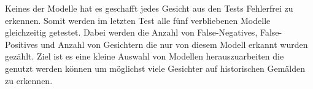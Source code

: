 Keines der Modelle hat es geschafft jedes Gesicht aus den Tests Fehlerfrei zu erkennen. Somit werden im letzten Test alle fünf verbliebenen Modelle gleichzeitig getestet. Dabei werden die Anzahl von False-Negatives, False-Positives und Anzahl von Gesichtern die nur von diesem Modell erkannt wurden gezählt. Ziel ist es eine kleine Auswahl von Modellen herauszuarbeiten die genutzt werden können um möglichst viele Gesichter auf historischen Gemälden zu erkennen.